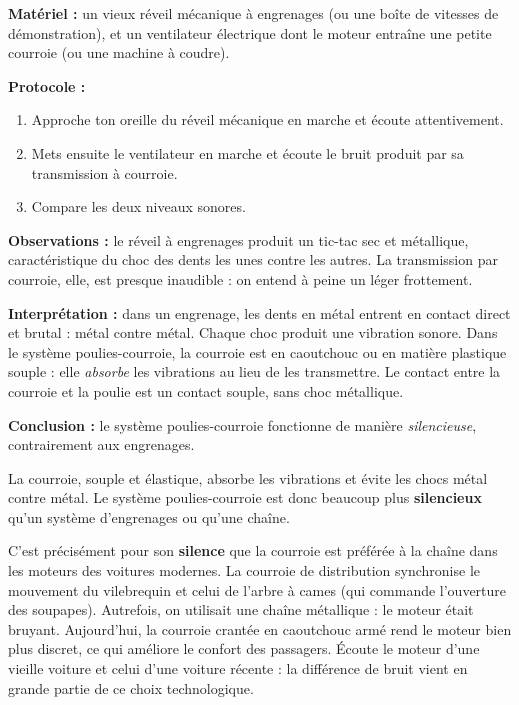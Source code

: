 \documentclass[11pt]{article}
\newcommand{\cle}[1]{{\popxbold\color{popdark}#1}}
\begin{document}
\begin{experience}
\textbf{Matériel :} un vieux réveil mécanique à engrenages (ou une boîte de vitesses de démonstration), et un ventilateur électrique dont le moteur entraîne une petite courroie (ou une machine à coudre).

\textbf{Protocole :}
\begin{enumerate}
\item Approche ton oreille du réveil mécanique en marche et écoute attentivement.
\item Mets ensuite le ventilateur en marche et écoute le bruit produit par sa transmission à courroie.
\item Compare les deux niveaux sonores.
\end{enumerate}

\textbf{Observations :} le réveil à engrenages produit un tic-tac sec et métallique, caractéristique du choc des dents les unes contre les autres. La transmission par courroie, elle, est presque inaudible : on entend à peine un léger frottement.

\textbf{Interprétation :} dans un engrenage, les dents en métal entrent en contact direct et brutal : métal contre métal. Chaque choc produit une vibration sonore. Dans le système poulies-courroie, la courroie est en \cle{caoutchouc} ou en matière plastique souple : elle \emph{absorbe} les vibrations au lieu de les transmettre. Le contact entre la courroie et la poulie est un contact souple, sans choc métallique.

\textbf{Conclusion :} le système poulies-courroie fonctionne de manière \emph{silencieuse}, contrairement aux engrenages.
\end{experience}

\begin{aretenir}
La courroie, souple et élastique, \cle{absorbe les vibrations} et évite les chocs métal contre métal. Le système poulies-courroie est donc beaucoup plus \textbf{silencieux} qu'un système d'engrenages ou qu'une chaîne.
\end{aretenir}

\begin{exemplebox}
C'est précisément pour son \textbf{silence} que la courroie est préférée à la chaîne dans les moteurs des voitures modernes. La \cle{courroie de distribution} synchronise le mouvement du vilebrequin et celui de l'arbre à cames (qui commande l'ouverture des soupapes). Autrefois, on utilisait une chaîne métallique : le moteur était bruyant. Aujourd'hui, la courroie crantée en caoutchouc armé rend le moteur bien plus discret, ce qui améliore le confort des passagers. Écoute le moteur d'une vieille voiture et celui d'une voiture récente : la différence de bruit vient en grande partie de ce choix technologique.
\end{exemplebox}
\end{document}
